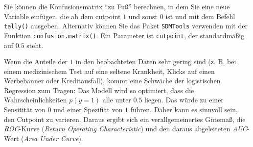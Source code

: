 \documentclass[12pt,]{book}
\makeatletter
\newenvironment{Shaded}{\begin{snugshade}}{\end{snugshade}}
\newcommand{\KeywordTok}[1]{\textcolor[rgb]{0.13,0.29,0.53}{\textbf{{#1}}}}
\newcommand{\DataTypeTok}[1]{\textcolor[rgb]{0.13,0.29,0.53}{{#1}}}
\newcommand{\DecValTok}[1]{\textcolor[rgb]{0.00,0.00,0.81}{{#1}}}
\newcommand{\FloatTok}[1]{\textcolor[rgb]{0.00,0.00,0.81}{{#1}}}
\newcommand{\StringTok}[1]{\textcolor[rgb]{0.31,0.60,0.02}{{#1}}}
\newcommand{\CommentTok}[1]{\textcolor[rgb]{0.56,0.35,0.01}{\textit{{#1}}}}
\newcommand{\NormalTok}[1]{{#1}}
\newenvironment{kframe}{%
\medskip{}
\setlength{\fboxsep}{.8em}
 \def\at@end@of@kframe{}%
 \ifinner\ifhmode%
  \def\at@end@of@kframe{\end{minipage}}%
  \begin{minipage}{\columnwidth}%
 \fi\fi%
 \def\FrameCommand##1{\hskip\@totalleftmargin \hskip-\fboxsep
 \colorbox{shadecolor}{##1}\hskip-\fboxsep
     \hskip-\linewidth \hskip-\@totalleftmargin \hskip\columnwidth}%
 \MakeFramed {\advance\hsize-\width
   \@totalleftmargin\z@ \linewidth\hsize
   \@setminipage}}%
 {\par\unskip\endMakeFramed%
 \at@end@of@kframe}
\renewenvironment{Shaded}{\begin{kframe}}{\end{kframe}}
\makeatother
\begin{document}
Sie können die Konfusionsmatrix ``zu Fuß'' berechnen, in dem Sie eine
neue Variable einfügen, die ab dem cutpoint \(1\) und sonst \(0\) ist
und mit dem Befehl \texttt{tally()} ausgeben. Alternativ können Sie das
Paket \texttt{SDMTools} verwenden mit der Funktion
\texttt{confusion.matrix()}. Ein Parameter ist \texttt{cutpoint}, der
standardmäßig auf \(0.5\) steht.

\begin{Shaded}
\end{Shaded}

Wenn die Anteile der \(1\) in den beobachteten Daten sehr gering sind
(z. B. bei einem medizinischem Test auf eine seltene Krankheit, Klicks
auf einen Werbebanner oder Kreditausfall), kommt eine Schwäche der
logistischen Regression zum Tragen: Das Modell wird so optimiert, dass
die Wahrscheinlichkeiten \(p(y=1)\) alle unter \(0.5\) liegen. Das würde
zu einer Sensitität von \(0\) und einer Spezifiät von \(1\) führen.
Daher kann es sinnvoll sein, den Cutpoint zu varieren. Daraus ergibt
sich ein verallgemeinertes Gütemaß, die \emph{ROC}-Kurve (\emph{Return
Operating Characteristic}) und den daraus abgeleiteten \emph{AUC}-Wert
(\emph{Area Under Curve}).
\end{document}
